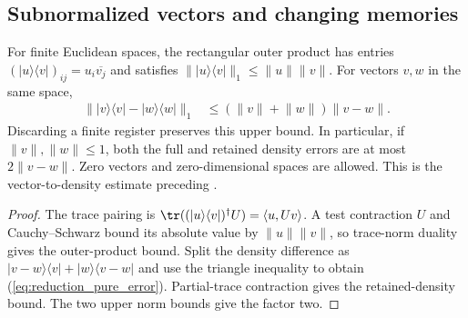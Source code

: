 \subsection{Subnormalized vectors and changing memories}

\begin{theorem}
    \label{thm:reduction_pure_error}
    \leanok
    For finite Euclidean spaces, the rectangular outer product has entries
    $(|u\rangle\langle v|)_{ij}=u_i\overline{v_j}$ and satisfies
    $\lVert|u\rangle\langle v|\rVert_1\leq\lVert u\rVert\lVert v\rVert$.
    For vectors $v,w$ in the same space,
    \begin{align}
        \lVert|v\rangle\langle v|-|w\rangle\langle w|\rVert_1
         & \leq(\lVert v\rVert+\lVert w\rVert)\lVert v-w\rVert.
        \label{eq:reduction_pure_error}
    \end{align}
    Discarding a finite register preserves this upper bound. In particular,
    if $\lVert v\rVert,\lVert w\rVert\leq1$, both the full and retained
    density errors are at most $2\lVert v-w\rVert$.
    Zero vectors and zero-dimensional spaces are allowed.
    This is the vector-to-density estimate preceding
    \cite[Equation~(5.3)]{OpenAI2026PolynomialPEPS}.
\end{theorem}

\begin{proof}\leanok
    The trace pairing is
    $\tr((|u\rangle\langle v|)^\dagger U)=\langle u,Uv\rangle$.
    A test contraction $U$ and Cauchy--Schwarz bound its absolute value by
    $\lVert u\rVert\lVert v\rVert$, so trace-norm duality gives the
    outer-product bound. Split the density difference as
    $|v-w\rangle\langle v|+|w\rangle\langle v-w|$ and use the triangle
    inequality to obtain (\ref{eq:reduction_pure_error}). Partial-trace
    contraction gives the retained-density bound. The two upper norm
    bounds give the factor two.
\end{proof}

